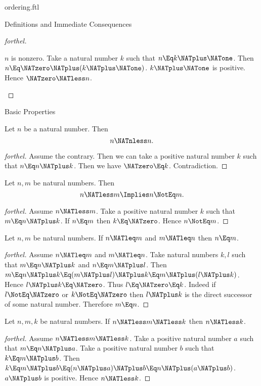 \documentclass{stex}
\begin{document}
\begin{smodule}{ordering.ftl}
\begin{sfragment}{Definitions and Immediate Consequences}
\begin{proof}[forthel]
    \begin{case}{$n$ is nonzero.}
      Take a natural number $k$ such that $n \Eq k \NATplus \NATone$.
      Then $n \Eq \NATzero \NATplus (k \NATplus \NATone)$.
      $k \NATplus \NATone$ is positive.
      Hence $\NATzero \NATless n$.
    \end{case}
  \end{proof}
\end{sfragment}

\begin{sfragment}{Basic Properties}
  \begin{proposition}[forthel]
    Let $n$ be a natural number.
    Then \[ n \NATnless n. \]
  \end{proposition}
  \begin{proof}[forthel]
    Assume the contrary.
    Then we can take a positive natural number $k$ such that $n \Eq n \NATplus k$.
    Then we have $\NATzero \Eq k$.
    Contradiction.
  \end{proof}

  \begin{proposition}[forthel]
    Let $n, m$ be natural numbers.
    Then \[ n \NATless m \Implies n \NotEq m. \]
  \end{proposition}
  \begin{proof}[forthel]
    Assume $n \NATless m$.
    Take a positive natural number $k$ such that $m \Eq n \NATplus k$.
    If $n \Eq m$ then $k \Eq \NATzero$.
    Hence $n \NotEq m$.
  \end{proof}

  \begin{proposition}[forthel]
    Let $n, m$ be natural numbers.
    If $n \NATleq m$ and $m \NATleq n$ then $n \Eq m$.
  \end{proposition}
  \begin{proof}[forthel]
    Assume $n \NATleq m$ and $m \NATleq n$.
    Take natural numbers $k, l$ such that $m \Eq n \NATplus k$ and $n \Eq m \NATplus l$.
    Then $m
      \Eq n \NATplus k
      \Eq (m \NATplus l) \NATplus k
      \Eq m \NATplus (l \NATplus k)$.
    Hence $l \NATplus k \Eq \NATzero$.
    Thus $l \Eq \NATzero \Eq k$.
    Indeed if $l \NotEq \NATzero$ or $k \NotEq \NATzero$ then $l \NATplus k$ is the direct successor of
    some natural number.
    Therefore $m \Eq n$.
  \end{proof}

  \begin{proposition}[forthel]
    Let $n, m, k$ be natural numbers.
    If $n \NATless m \NATless k$ then $n \NATless k$.
  \end{proposition}
  \begin{proof}[forthel]
    Assume $n \NATless m \NATless k$.
    Take a positive natural number $a$ such that $m \Eq n \NATplus a$.
    Take a positive natural number $b$ such that $k \Eq m \NATplus b$.
    Then $k
      \Eq m \NATplus b
      \Eq (n \NATplus a) \NATplus b
      \Eq n \NATplus (a \NATplus b)$.
    $a \NATplus b$ is positive.
    Hence $n \NATless k$.
  \end{proof}


\end{sfragment}
\end{smodule}
\end{document}
